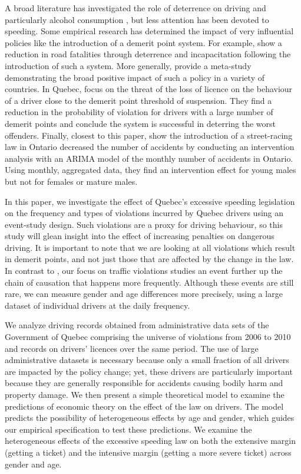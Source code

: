A broad literature has investigated the role of deterrence on driving 
and particularly alcohol consumption 
\citep[e.g.][]{hansen2015}, 
but less attention has been devoted to speeding. 
Some empirical research has determined the impact of very influential policies 
like the introduction of a demerit point system. 
For example, 
\citet{bennedittiniNicita2009} 
show a reduction in road fatalities 
through deterrence and incapacitation following the introduction of such a system. 
More generally, 
\citet{castillocastro2012} 
provide a meta-study 
demonstrating the broad positive impact of such a policy in a variety of countries. 
In Quebec, 
\citet{dionneetal2011} 
focus on the threat of the loss of licence 
on the behaviour of a driver close to the demerit point threshold of suspension. 
They find a reduction in the probability of violation for drivers 
with a large number of demerit points and conclude 
the system is successful in deterring the worst offenders. 
Finally, closest to this paper, 
\citet{meirambayeva2014} 
show the introduction of a street-racing law in Ontario decreased the number of accidents 
by conducting an intervention analysis with an ARIMA model of 
the monthly number of accidents in Ontario.
%
Using monthly, aggregated data, 
they find an intervention effect for young males
but not for females or mature males. 


In this paper, we investigate the effect of Quebec’s excessive speeding legislation
on the frequency and types of violations incurred by Quebec drivers 
using an event-study design. 
Such violations are a proxy for driving behaviour, 
so this study will glean insight into the effect of increasing penalties on dangerous driving. 
It is important to note that we are looking at all violations which result in demerit points, 
and not just those that are affected by the change in the law. 
% 
In contrast to \citet{meirambayeva2014}, 
our focus on traffic violations
studies an event further up the chain of causation that happens more frequently. 
Although these events are still rare,
we can measure gender and age differences more precisely, 
using a large dataset of individual drivers at the daily frequency. 

We analyze driving records obtained from administrative data sets 
of the Government of Quebec comprising the universe of violations 
from 2006 to 2010 and records on drivers’ licences over the same period. 
The use of large administrative datasets is necessary because only a small fraction 
of all drivers are impacted by the policy change; 
yet, these drivers are particularly important because they are 
generally responsible for accidents causing bodily harm and property damage. 
% 
We then present a simple theoretical model to examine the predictions of economic theory 
on the effect of the law on drivers.
%
The model predicts the possibility of heterogeneous effects by age and gender,  
which guides our empirical specification to test these predictions. 
% 
We examine the heterogeneous effects of the excessive speeding law 
on both the extensive margin (getting a ticket) 
and the intensive margin (getting a more severe ticket) across gender and age. 


